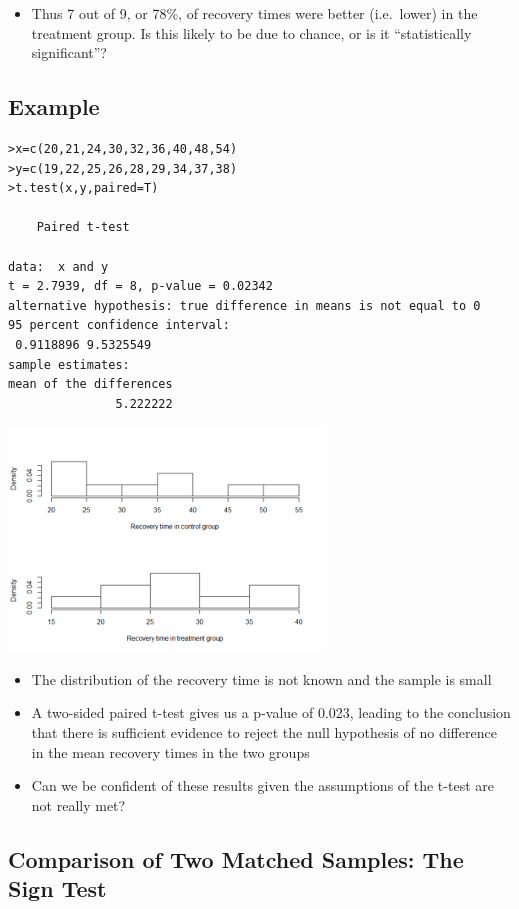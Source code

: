 \documentclass[
]{book}
\providecommand{\tightlist}{%
  \setlength{\itemsep}{0pt}\setlength{\parskip}{0pt}}
\begin{document}
\begin{itemize}
\tightlist
\item
  Thus 7 out of 9, or 78\%, of recovery times were better (i.e.~lower) in the treatment group. Is this likely to be due to chance, or is it ``statistically significant''?
\end{itemize}

\hypertarget{example-8}{%
\subsection{Example}\label{example-8}}

\begin{verbatim}
>x=c(20,21,24,30,32,36,40,48,54)
>y=c(19,22,25,26,28,29,34,37,38)
>t.test(x,y,paired=T)

    Paired t-test

data:  x and y
t = 2.7939, df = 8, p-value = 0.02342
alternative hypothesis: true difference in means is not equal to 0
95 percent confidence interval:
 0.9118896 9.5325549
sample estimates:
mean of the differences 
               5.222222 
\end{verbatim}

\includegraphics[width=0.5\linewidth]{./9_9}

\begin{itemize}
\tightlist
\item
  The distribution of the recovery time is not known and the sample is small
\item
  A two-sided paired t-test gives us a p-value of 0.023, leading to the conclusion that there is sufficient evidence to reject the null hypothesis of no difference in the mean recovery times in the two groups
\item
  Can we be confident of these results given the assumptions of the t-test are not really met?
\end{itemize}

\hypertarget{comparison-of-two-matched-samples-the-sign-test}{%
\subsection{Comparison of Two Matched Samples: The Sign Test}\label{comparison-of-two-matched-samples-the-sign-test}}
\end{document}
